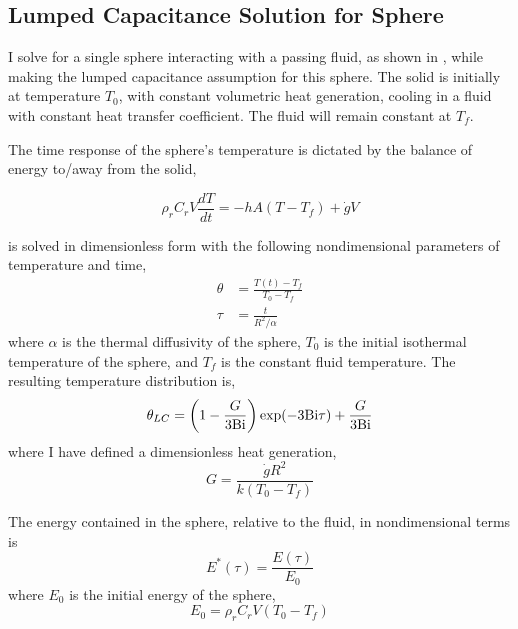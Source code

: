 \subsection{Lumped Capacitance Solution for Sphere}\label{sec:lumped-capacitance}
I solve for a single sphere interacting with a passing fluid, as shown in , while making the lumped capacitance assumption for this sphere. The solid is initially at temperature $T_0$, with constant volumetric heat generation, cooling in a fluid with constant heat transfer coefficient. The fluid will remain constant at $T_f$.

The time response of the sphere's temperature is dictated by the balance of energy to/away from the solid,  

\begin{equation}\label{eq:lc-energy-balance}
	\rho_rC_rV\frac{dT}{dt} = -hA(T-T_f) + \dot{g}V
\end{equation}

 is solved in dimensionless form with the following nondimensional parameters of temperature and time,
\begin{subequations}
\begin{align}
    \theta &= \frac{T(t) - T_f}{T_0 - T_f}\\
    \tau & = \frac{t}{R^2/\alpha}
\end{align}
\end{subequations}
where $\alpha$ is the thermal diffusivity of the sphere, $T_0$ is the initial isothermal temperature of the sphere, and $T_f$ is the constant fluid temperature. The resulting temperature distribution is,
\begin{equation}
\label{eq:theta-lc}
	\theta_{LC}=\left(1-\frac{G}{3\mathrm{Bi}}\right)\exp(-3\mathrm{Bi} \tau) + \frac{G}{3\mathrm{Bi}}
\end{equation}
where I have defined a dimensionless heat generation,
\begin{equation}\label{eq:nondimensional-heat-generation}
	G = \frac{\dot{g}R^2}{k(T_0 - T_f)}
\end{equation}

The energy contained in the sphere, relative to the fluid, in nondimensional terms is 
\begin{equation}
    E^*(\tau)=\frac{E(\tau)}{E_0}
\end{equation}
where $E_0$ is the initial energy of the sphere,
\begin{equation}
    E_0=\rho_rC_rV(T_0-T_f)
\end{equation}

